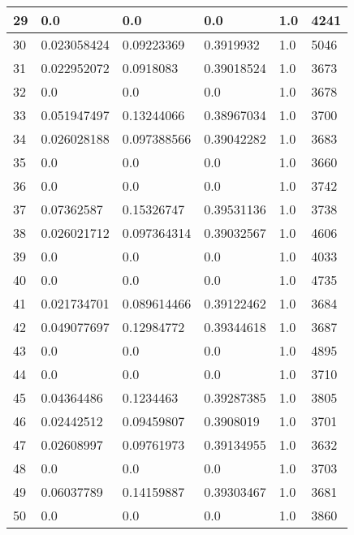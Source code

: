\begin{longtable}{|l|l|l|l|l|l|}
29 & 0.0 & 0.0 & 0.0 & 1.0 & 4241 \\ \hline 
30 & 0.023058424 & 0.09223369 & 0.3919932 & 1.0 & 5046 \\ \hline 
31 & 0.022952072 & 0.0918083 & 0.39018524 & 1.0 & 3673 \\ \hline 
32 & 0.0 & 0.0 & 0.0 & 1.0 & 3678 \\ \hline 
33 & 0.051947497 & 0.13244066 & 0.38967034 & 1.0 & 3700 \\ \hline 
34 & 0.026028188 & 0.097388566 & 0.39042282 & 1.0 & 3683 \\ \hline 
35 & 0.0 & 0.0 & 0.0 & 1.0 & 3660 \\ \hline 
36 & 0.0 & 0.0 & 0.0 & 1.0 & 3742 \\ \hline 
37 & 0.07362587 & 0.15326747 & 0.39531136 & 1.0 & 3738 \\ \hline 
38 & 0.026021712 & 0.097364314 & 0.39032567 & 1.0 & 4606 \\ \hline 
39 & 0.0 & 0.0 & 0.0 & 1.0 & 4033 \\ \hline 
40 & 0.0 & 0.0 & 0.0 & 1.0 & 4735 \\ \hline 
41 & 0.021734701 & 0.089614466 & 0.39122462 & 1.0 & 3684 \\ \hline 
42 & 0.049077697 & 0.12984772 & 0.39344618 & 1.0 & 3687 \\ \hline 
43 & 0.0 & 0.0 & 0.0 & 1.0 & 4895 \\ \hline 
44 & 0.0 & 0.0 & 0.0 & 1.0 & 3710 \\ \hline 
45 & 0.04364486 & 0.1234463 & 0.39287385 & 1.0 & 3805 \\ \hline 
46 & 0.02442512 & 0.09459807 & 0.3908019 & 1.0 & 3701 \\ \hline 
47 & 0.02608997 & 0.09761973 & 0.39134955 & 1.0 & 3632 \\ \hline 
48 & 0.0 & 0.0 & 0.0 & 1.0 & 3703 \\ \hline 
49 & 0.06037789 & 0.14159887 & 0.39303467 & 1.0 & 3681 \\ \hline 
50 & 0.0 & 0.0 & 0.0 & 1.0 & 3860 \\ \hline 
\end{longtable}